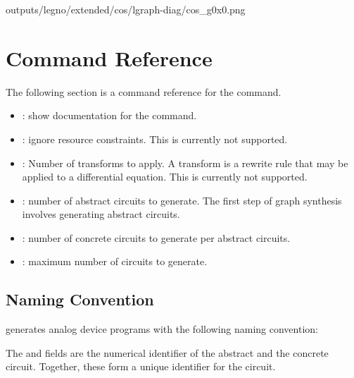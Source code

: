 \begin{snippet}
  outputs/legno/extended/cos/lgraph-diag/cos_g0x0.png
\end{snippet}


\section{\lgraph Command Reference}

The following section is a command reference for the \lgraph command.

\begin{itemize}
\item {}: show documentation for the command.
\item {}: ignore resource constraints. This is currently not supported. 
\item {}: Number of transforms to apply. A transform is a rewrite
  rule that may be applied to a differential equation. This is currently not supported. 
\item {}: number of abstract circuits to generate. The first
  step of graph synthesis involves generating abstract circuits.
\item {}: number of concrete circuits to generate per abstract
  circuits.
\item {}: maximum number of circuits to generate.
\end{itemize}


\subsection{ Naming Convention}

\lgraph generates analog device programs with the following naming convention:

\begin{snippet}
outputs/legno/<subset>/<prog>/lgraph-adp/{<prog>_g<abs>x<conc>.png
\end{snippet}

The  and  fields are the numerical identifier of the
abstract and the concrete circuit. Together, these form a unique identifier for
the circuit.


